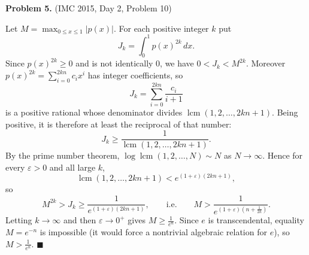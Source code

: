 \documentclass{article}
\newcommand{\lcm}{\operatorname{lcm}}
\begin{document}
\bigskip

\noindent\textbf{Problem 5.} (IMC 2015, Day 2, Problem 10)

\medskip
\noindent Let \( M = \max_{0 \leq x \leq 1} |p(x)| \). For each positive integer \( k \) put
\[
J_k = \int_0^1 p(x)^{2k}\, dx.
\]
Since \( p(x)^{2k} \geq 0 \) and is not identically \( 0 \), we have \( 0 < J_k < M^{2k} \). Moreover \( p(x)^{2k} = \sum_{i=0}^{2kn} c_i x^i \) has integer coefficients, so
\[
J_k = \sum_{i=0}^{2kn} \frac{c_i}{i+1}
\]
is a positive rational whose denominator divides \( \lcm(1, 2, \dots, 2kn+1) \). Being positive, it is therefore at least the reciprocal of that number:
\[
J_k \geq \frac{1}{\lcm(1, 2, \dots, 2kn+1)}.
\]
By the prime number theorem, \( \log \lcm(1,2,\dots,N) \sim N \) as \( N \to \infty \). Hence for every \( \varepsilon > 0 \) and all large \( k \),
\[
\lcm(1,2,\dots,2kn+1) < e^{(1+\varepsilon)(2kn+1)},
\]
so
\[
M^{2k} > J_k \geq \frac{1}{e^{(1+\varepsilon)(2kn+1)}}, \qquad\text{i.e.}\qquad M > \frac{1}{e^{(1+\varepsilon)\left(n + \frac{1}{2k}\right)}}.
\]
Letting \( k \to \infty \) and then \( \varepsilon \to 0^+ \) gives \( M \geq \tfrac{1}{e^n} \). Since \( e \) is transcendental, equality \( M = e^{-n} \) is impossible (it would force a nontrivial algebraic relation for \( e \)), so \( M > \tfrac{1}{e^n} \). \hfill\( \blacksquare \)
\end{document}
